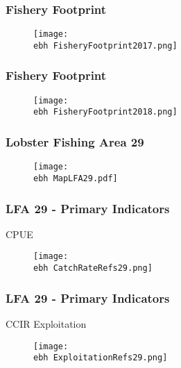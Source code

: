 \documentclass{beamer}
\newcommand{\ebh}{\string~/bio.data/bio.lobster/figures/Assessment/LFA2732/} %
\begin{document}
\begin{frame}
\frametitle{Fishery Footprint}
\begin{figure}
        \begin{center}
            \texttt{[image: \\ebh FisheryFootprint2017.png]}
        \end{center}
    \end{figure}
\end{frame}




\begin{frame}
\frametitle{Fishery Footprint}
\begin{figure}
        \begin{center}
            \texttt{[image: \\ebh FisheryFootprint2018.png]}
        \end{center}
    \end{figure}
\end{frame}







\begin{frame}
\frametitle{Lobster Fishing Area 29}
\begin{figure}
        \begin{center}
            \texttt{[image: \\ebh MapLFA29.pdf]}
        \end{center}
    \end{figure}
\end{frame}


\begin{frame}
\frametitle{LFA 29 - Primary Indicators}
CPUE
\begin{figure}
        \begin{center}
            \texttt{[image: \\ebh CatchRateRefs29.png]}
        \end{center}
    \end{figure}
\end{frame}



\begin{frame}
\frametitle{LFA 29 - Primary Indicators}
CCIR Exploitation 
\begin{figure}
        \begin{center}
            \texttt{[image: \\ebh ExploitationRefs29.png]}
        \end{center}
    \end{figure}
\end{frame}
\end{document}
